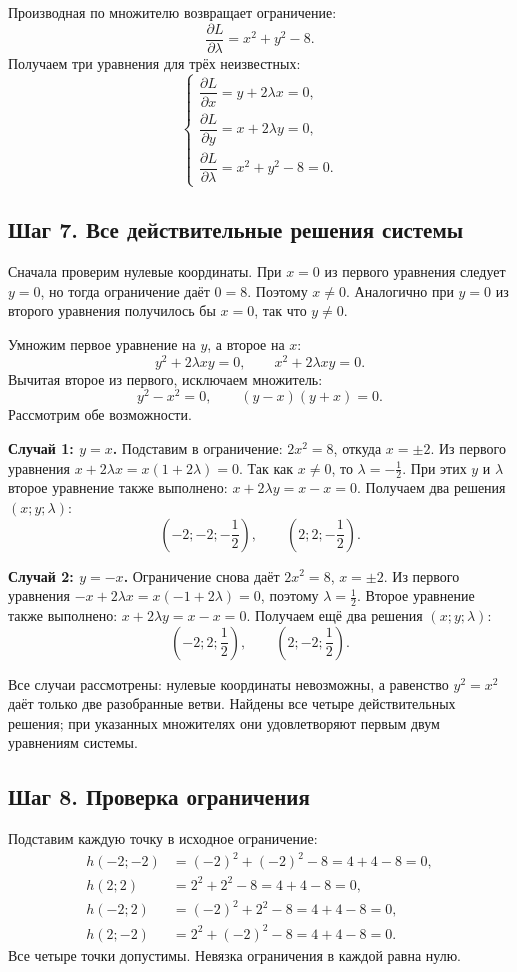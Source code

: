 \documentclass[a4paper,12pt]{article}
\newcommand{\pds}[2]{\dfrac{\partial #1}{\partial #2}}
\begin{document}
Производная по множителю возвращает ограничение:
\[
\frac{\partial L}{\partial\lambda}=x^2+y^2-8.
\]
Получаем три уравнения для трёх неизвестных:
\[
\begin{cases}
\pds{L}{x}=y+2\lambda x=0,\\[10pt]
\pds{L}{y}=x+2\lambda y=0,\\[10pt]
\pds{L}{\lambda}=x^2+y^2-8=0.
\end{cases}
\]

\subsection*{Шаг 7. Все действительные решения системы}

Сначала проверим нулевые координаты. При $x=0$ из первого уравнения следует $y=0$, но тогда ограничение даёт $0=8$. Поэтому $x\ne0$. Аналогично при $y=0$ из второго уравнения получилось бы $x=0$, так что $y\ne0$.

Умножим первое уравнение на $y$, а второе на $x$:
\[
y^2+2\lambda xy=0,\qquad x^2+2\lambda xy=0.
\]
Вычитая второе из первого, исключаем множитель:
\[
y^2-x^2=0,\qquad (y-x)(y+x)=0.
\]
Рассмотрим обе возможности.

\textbf{Случай 1: $y=x$.} Подставим в ограничение: $2x^2=8$, откуда $x=\pm2$. Из первого уравнения $x+2\lambda x=x(1+2\lambda)=0$. Так как $x\ne0$, то $\lambda=-\frac12$. При этих $y$ и $\lambda$ второе уравнение также выполнено: $x+2\lambda y=x-x=0$. Получаем два решения $(x;y;\lambda)$:
\[
\left(-2;-2;-\frac12\right),\qquad
\left(2;2;-\frac12\right).
\]

\textbf{Случай 2: $y=-x$.} Ограничение снова даёт $2x^2=8$, $x=\pm2$. Из первого уравнения $-x+2\lambda x=x(-1+2\lambda)=0$, поэтому $\lambda=\frac12$. Второе уравнение также выполнено: $x+2\lambda y=x-x=0$. Получаем ещё два решения $(x;y;\lambda)$:
\[
\left(-2;2;\frac12\right),\qquad
\left(2;-2;\frac12\right).
\]

Все случаи рассмотрены: нулевые координаты невозможны, а равенство $y^2=x^2$ даёт только две разобранные ветви. Найдены все четыре действительных решения; при указанных множителях они удовлетворяют первым двум уравнениям системы.

\subsection*{Шаг 8. Проверка ограничения}

Подставим каждую точку в исходное ограничение:
\begin{align*}
h(-2;-2)&=(-2)^2+(-2)^2-8=4+4-8=0,\\
h(2;2)&=2^2+2^2-8=4+4-8=0,\\
h(-2;2)&=(-2)^2+2^2-8=4+4-8=0,\\
h(2;-2)&=2^2+(-2)^2-8=4+4-8=0.
\end{align*}
Все четыре точки допустимы. Невязка ограничения в каждой равна нулю.
\end{document}
